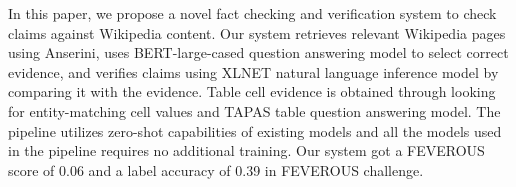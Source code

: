 In this paper, we propose a novel fact checking and verification system to check claims against Wikipedia content. Our system retrieves relevant Wikipedia pages using Anserini, uses BERT-large-cased question answering model to select correct evidence, and verifies claims using XLNET natural language inference model by comparing it with the evidence. Table cell evidence is obtained through looking for entity-matching cell values and TAPAS table question answering model. The pipeline utilizes zero-shot capabilities of existing models and all the models used in the pipeline requires no additional training. Our system got a FEVEROUS score of 0.06 and a label accuracy of 0.39 in FEVEROUS challenge.
